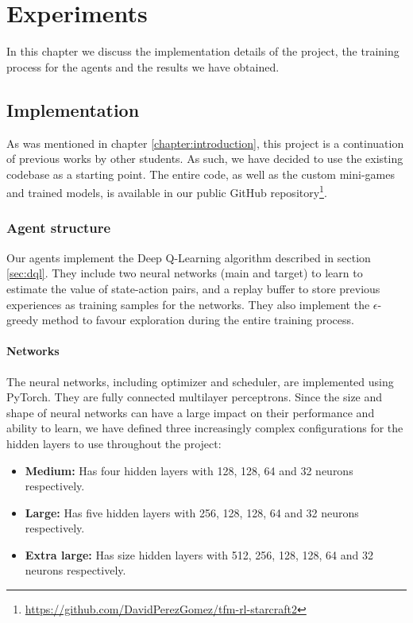 \chapter{Experiments}
\label{chapter:experiments}

In this chapter we discuss the implementation details of the project, the training process for the agents and the results we have obtained.

\section{Implementation}

As was mentioned in chapter \ref{chapter:introduction}, this project is a continuation of previous works by other students. As such, we have decided to use the existing codebase as a starting point. The entire code, as well as the custom mini-games and trained models, is available in our public GitHub repository\footnote{\url{https://github.com/DavidPerezGomez/tfm-rl-starcraft2}}.

\subsection{Agent structure}
\label{sec:agent_structure}

Our agents implement the Deep Q-Learning algorithm described in section \ref{sec:dql}. They include two neural networks (main and target) to learn to estimate the value of state-action pairs, and a replay buffer to store previous experiences as training samples for the networks. They also implement the $\epsilon$-greedy method to favour exploration during the entire training process.

\subsubsection*{Networks}

The neural networks, including optimizer and scheduler, are implemented using PyTorch. They are fully connected multilayer perceptrons. Since the size and shape of neural networks can have a large impact on their performance and ability to learn, we have defined three increasingly complex configurations for the hidden layers to use throughout the project:

\begin{itemize}
    \item \textbf{Medium:} Has four hidden layers with 128, 128, 64 and 32 neurons respectively.
    \item \textbf{Large:} Has five hidden layers with 256, 128, 128, 64 and 32 neurons respectively.
    \item \textbf{Extra large:} Has size hidden layers with 512, 256, 128, 128, 64 and 32 neurons respectively.
\end{itemize}

